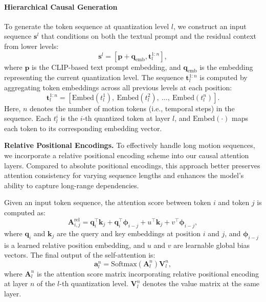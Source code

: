 \documentclass[a4paper,12pt]{article}
\begin{document}
\paragraph{Hierarchical Causal Generation} 
To generate the token sequence at quantization level \( l \), we construct an input sequence \( \mathbf{s}^l \) that conditions on both the textual prompt and the residual context from lower levels:
\begin{equation}
\mathbf{s}^l = [\mathbf{p} + \mathbf{q}_{\text{emb}}, \mathbf{t}_{l}^{1:n}],
\end{equation}
where $\mathbf{p}$ is the CLIP-based text prompt embedding, and $\mathbf{q}_{\text{emb}}$ is the embedding representing the current quantization level. The sequence $\mathbf{t}_l^{1:n}$ is computed by aggregating token embeddings across all previous levels at each position:
\begin{equation}
\mathbf{t}_{l}^{1:n} = \left[ \text{Embed}(t_{l}^{1}),\ \text{Embed}(t_{l}^{2}),\ \ldots,\ \text{Embed}(t_{l}^{n}) \right].
\end{equation}
Here, \( n \) denotes the number of motion tokens (i.e., temporal steps) in the sequence. Each \( t_{l}^{i} \) is the \( i \)-th quantized token at layer \( l \), and \( \text{Embed}(\cdot) \) maps each token to its corresponding embedding vector.

\textbf{Relative Positional Encodings.} To effectively handle long motion sequences, we incorporate a relative positional encoding scheme into our causal attention layers. Compared to absolute positional encodings, this approach better preserves attention consistency for varying sequence lengths and enhances the model’s ability to capture long-range dependencies.

Given an input token sequence, the attention score between token $i$ and token $j$ is computed as:
\begin{equation}
\mathbf{A}^{\text{rel}}_{i,j} = \mathbf{q}_i^\top \mathbf{k}_j + \mathbf{q}_i^\top \mathbf{\phi}_{i-j} + u^\top \mathbf{k}_j + v^\top \mathbf{\phi}_{i-j},
\end{equation}
where $\mathbf{q}_i$ and $\mathbf{k}_j$ are the query and key embeddings at position $i$ and $j$, and $\mathbf{\phi}_{i-j}$ is a learned relative position embedding, and $u$ and $v$ are learnable global bias vectors. The final output of the self-attention is:
\begin{equation}
\mathbf{a}_l^n = \text{Softmax}(\mathbf{A}_l^n) \mathbf{V}_l^n,
\end{equation}
where \( \mathbf{A}_l^n \) is the attention score matrix incorporating relative positional encoding at layer \( n \) of the \( l \)-th quantization level. \( \mathbf{V}_l^n \) denotes the value matrix at the same layer. 
\end{document}
